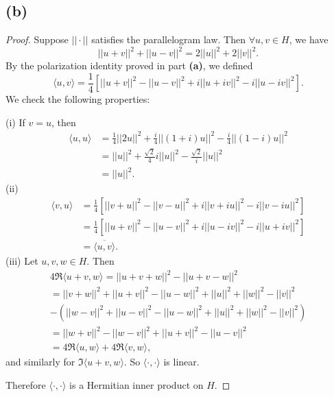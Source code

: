 \documentclass{article}
\begin{document}
\subsection*{(b)}
\begin{proof}
	Suppose $||\cdot||$ satisfies the parallelogram law. Then $\forall u, v \in H$, we have
	\begin{equation}
		||u + v||^2 + ||u - v||^2 = 2 ||u||^2 + 2||v||^2.
	\end{equation}
	By the polarization identity proved in part \textbf{(a)}, we defined
	\begin{equation}
		\langle u, v \rangle = \frac{1}{4}[||u + v||^2 - ||u - v||^2 + i||u + iv||^2 - i ||u - iv||^2].
	\end{equation}
	We check the following properties:
	
	(i) If $v = u$, then
	\begin{align}
		\langle u, u \rangle &= \frac{1}{4} ||2u||^2 + \frac{i}{4}||(1 + i)u||^2 - \frac{i}{4}||(1 - i)u||^2 \\
		&= ||u||^2 + \frac{\sqrt{2}}{4}i ||u||^2 - \frac{\sqrt{2}}{i}||u||^2 \\
		&= ||u||^2.
	\end{align}
	(ii) \begin{align}
		\langle v, u \rangle  &= \frac{1}{4}[||v + u||^2 - ||v - u||^2 + i ||v + iu||^2 - i||v - iu||^2] \\
		&= \frac{1}{4}[||u + v||^2 - ||u - v||^2 + i||u - iv||^2 - i||u + iv||^2] \\
		&= \overline{\langle u, v \rangle}.
	\end{align}
	(iii) Let $u, v, w \in H$. Then
	\begin{align}
		4 \Re \langle u+v, w \rangle = ||u + v + w||^2 - ||u + v - w||^2 \\
		= ||v + w ||^2 + ||u + v||^2 - ||u - w||^2 + ||u||^2 + ||w||^2 - ||v||^2 \\
		 - (||w - v||^2 + ||u - v||^2 - ||u - w||^2 + ||u||^2 + ||w||^2 - ||v||^2) \\
		= ||w + v||^2 - ||w - v||^2 + ||u + v||^2 - ||u - v||^2 \\
		= 4 \Re \langle u, w \rangle + 4 \Re \langle v, w \rangle,
	\end{align}
	and similarly for $\Im \langle u+v, w \rangle$. So $\langle\cdot, \cdot \rangle$ is linear.
	
	Therefore $\langle \cdot, \cdot \rangle$ is a Hermitian inner product on $H$.
\end{proof}
\end{document}
